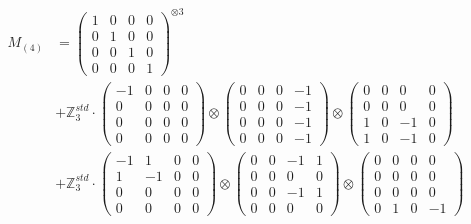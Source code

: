 \documentclass{article}
\newcommand{\Mthree}{%
    M_{(4)}
}
\begin{document}
        \footnotesize{
        \begin{align}
        \Mthree
        &= \label{Rs1-Rc16-Solution-5-c1} \begin{pmatrix} 1 & 0 & 0 & 0 \\ 0 & 1 & 0 & 0 \\ 0 & 0 & 1 & 0 \\ 0 & 0 & 0 & 1 \end{pmatrix}^{\otimes 3} \\
        &+ \label{Rs1-Rc16-Solution-5-c2} \mathbb{Z}_3^{std} \cdot 
            \begin{pmatrix} -1 & 0 & 0 & 0 \\ 0 & 0 & 0 & 0 \\ 0 & 0 & 0 & 0 \\ 0 & 0 & 0 & 0 \end{pmatrix} \otimes 
            \begin{pmatrix} 0 & 0 & 0 & -1 \\ 0 & 0 & 0 & -1 \\ 0 & 0 & 0 & -1 \\ 0 & 0 & 0 & -1 \end{pmatrix} \otimes 
            \begin{pmatrix} 0 & 0 & 0 & 0 \\ 0 & 0 & 0 & 0 \\ 1 & 0 & -1 & 0 \\ 1 & 0 & -1 & 0 \end{pmatrix} \\ 
        &+ \label{Rs1-Rc16-Solution-5-c3} \mathbb{Z}_3^{std} \cdot 
            \begin{pmatrix} -1 & 1 & 0 & 0 \\ 1 & -1 & 0 & 0 \\ 0 & 0 & 0 & 0 \\ 0 & 0 & 0 & 0 \end{pmatrix} \otimes 
            \begin{pmatrix} 0 & 0 & -1 & 1 \\ 0 & 0 & 0 & 0 \\ 0 & 0 & -1 & 1 \\ 0 & 0 & 0 & 0 \end{pmatrix} \otimes 
            \begin{pmatrix} 0 & 0 & 0 & 0 \\ 0 & 0 & 0 & 0 \\ 0 & 0 & 0 & 0 \\ 0 & 1 & 0 & -1 \end{pmatrix} \\ 

\end{align}}
\end{document}
